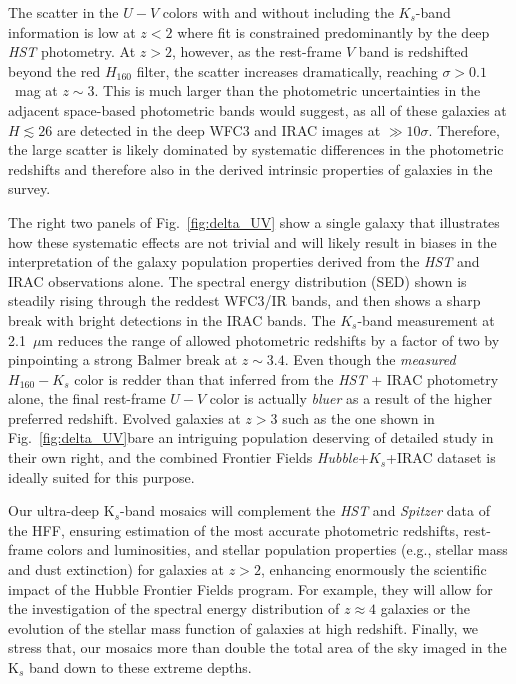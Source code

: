 \documentclass[preprint2]{aastex6}
\begin{document}
The scatter in the $U-V$ colors with and without including the $K_s$-band information is low at $z<2$ where fit is constrained predominantly by the deep \textit{HST} photometry.  At $z>2$, however, as the rest-frame $V$ band is redshifted beyond the red $H_{160}$ filter, the scatter increases dramatically, reaching $\sigma>0.1$~mag at $z\sim3$.  This is much larger than the photometric uncertainties in the adjacent space-based photometric bands would suggest, as all of these galaxies at $H\lesssim26$ are detected in the deep WFC3 and IRAC images at $\gg10$$\sigma$.  Therefore, the large scatter is likely dominated by systematic differences in the photometric redshifts and therefore also in the derived intrinsic properties of galaxies in the survey.  

The right two panels of Fig.~\ref{fig:delta_UV} show a single galaxy that illustrates how these systematic effects are not trivial and will likely result in biases in the interpretation of the galaxy population properties derived from the \textit{HST} and IRAC observations alone.  The spectral energy distribution (SED) shown is steadily rising through the reddest WFC3/IR bands, and then shows a sharp break with bright detections in the IRAC bands.  The $K_s$-band measurement at 2.1~$\mu$m reduces the range of allowed photometric redshifts by a factor of two by pinpointing a strong Balmer break at $z\sim3.4$.  Even though the \textit{measured} $H_{160}-K_s$ color is redder than that inferred from the \textit{HST} + IRAC photometry alone, the final rest-frame $U-V$ color is actually \textit{bluer} as a result of the higher preferred redshift.  Evolved galaxies at $z>3$ such as the one shown in Fig.~\ref{fig:delta_UV}bare an intriguing population deserving of detailed study in their own right, and the combined Frontier Fields \textit{Hubble}+$K_s$+IRAC dataset is ideally suited for this purpose.

Our ultra-deep K$_{s}$-band mosaics will complement the {\it HST} and {\it Spitzer} data of the HFF, ensuring estimation of the most accurate photometric redshifts, rest-frame colors and luminosities, and stellar population properties (e.g., stellar mass and dust extinction) for galaxies at $z>2$, enhancing enormously the scientific impact of the Hubble Frontier Fields program. For example, they will allow for the investigation of the spectral energy distribution of $z\approx4$ galaxies or the evolution of the stellar mass function of galaxies at high redshift. Finally, we stress that, our mosaics more than double the total area of the sky imaged in the K$_{s}$ band down to these extreme depths. 
\end{document}
